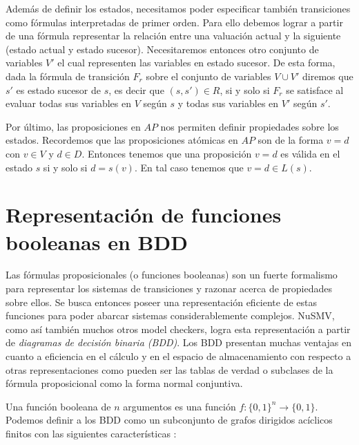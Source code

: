 \documentclass[titlepage, 12pt]{book}
\begin{document}
Adem\'as de definir los estados, necesitamos poder especificar tambi\'en transiciones como f\'ormulas interpretadas de primer orden. Para ello debemos lograr a partir de una f\'ormula representar la relaci\'on entre una valuaci\'on actual y la siguiente (estado actual y estado sucesor). Necesitaremos entonces otro conjunto de variables $V'$ el cual representen las variables en estado sucesor. De esta forma, dada la f\'ormula de transici\'on $F_r$ sobre el conjunto de variables $V \cup V'$ diremos que $s'$ es estado sucesor de $s$, es decir que $(s,s')\in R$, si y solo si $F_r$ se satisface al evaluar todas sus variables en $V$ seg\'un $s$ y todas sus variables en $V'$ seg\'un $s'$.

Por \'ultimo, las proposiciones en $AP$ nos permiten definir propiedades sobre los estados. Recordemos que las proposiciones at\'omicas en $AP$ son de la forma $v=d$ con $v \in V$ y $d \in D$. Entonces tenemos que una proposici\'on $v=d$ es v\'alida en el estado $s$ si y solo si $d = s(v)$. En tal caso tenemos que $v=d \in L(s)$.








\section{Representaci\'on de funciones booleanas en BDD}
\label{boolBDD}

Las f\'ormulas proposicionales (o funciones booleanas) son un fuerte formalismo para representar los sistemas de transiciones y razonar acerca de propiedades sobre ellos. Se busca entonces poseer una representaci\'on eficiente de estas funciones para poder abarcar sistemas considerablemente complejos. NuSMV, como as\'i tambi\'en muchos otros model checkers, logra esta representaci\'on a partir de \textit{diagramas de decisi\'on binaria (BDD)}. Los BDD presentan muchas ventajas en cuanto a eficiencia en el c\'alculo y en el espacio de almacenamiento con respecto a otras representaciones como pueden ser las tablas de verdad o subclases de la f\'ormula proposicional como la forma normal conjuntiva.

Una funci\'on booleana de $n$ argumentos es una funci\'on $f : \{0,1\}^n \to \{0,1\}$. Podemos definir a los BDD como un subconjunto de grafos dirigidos ac\'iclicos finitos con las siguientes caracter\'isticas \cite{Huth}:
\end{document}
